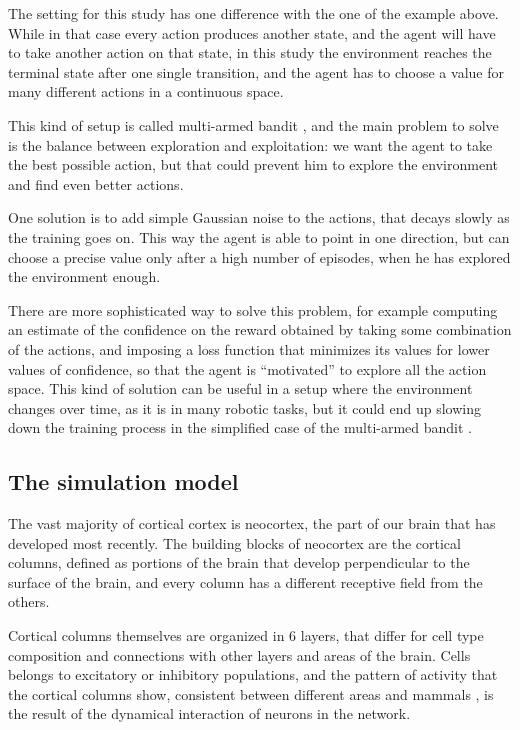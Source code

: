 The setting for this study has one difference with the one of the example above. While in that case every action produces another state, and the agent will have to take another action on that state, in this study the environment reaches the terminal state after one single transition, and the agent has to choose a value for many different actions in a continuous space. 

This kind of setup is called multi-armed bandit \cite{auer2002nonstochastic}, and the main problem to solve is the balance between exploration and exploitation: we want the agent to take the best possible action, but that could prevent him to explore the environment and find even better actions.

One solution is to add simple Gaussian noise to the actions, that decays slowly as the training goes on. This way the agent is able to point in one direction, but can choose a precise value only after a high number of episodes, when he has explored the environment enough.

There are more sophisticated way to solve this problem, for example computing an estimate of the confidence on the reward obtained by taking some combination of the actions, and imposing a loss function that minimizes its values for lower values of confidence, so that the agent is ``motivated'' to explore all the action space. This kind of solution can be useful in a setup where the environment changes over time, as it is in many robotic tasks, but it could end up slowing down the training process in the simplified case of the multi-armed bandit \cite{wawrzynski2015control}.

\subsection{The simulation model} 

The vast majority of cortical cortex is neocortex, the part of our brain that has developed most recently. The building blocks of neocortex are the cortical columns, defined as portions of the brain that develop perpendicular to the surface of the brain, and every column has a different receptive field from the others.

Cortical columns themselves are organized in 6 layers, that differ for cell type composition and connections with other layers and areas of the brain. Cells belongs to excitatory or inhibitory populations, and the pattern of activity that the cortical columns show, consistent between different areas and mammals \cite{kock}, is the result of the dynamical interaction of neurons in the network.

